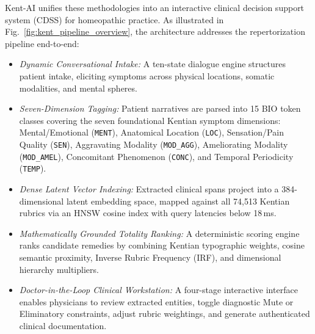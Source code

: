 Kent-AI unifies these methodologies into an interactive clinical decision support system (CDSS) for homeopathic practice. As illustrated in Fig.~\ref{fig:kent_pipeline_overview}, the architecture addresses the repertorization pipeline end-to-end:
\begin{itemize}
    \item \textit{Dynamic Conversational Intake:} A ten-state dialogue engine structures patient intake, eliciting symptoms across physical locations, somatic modalities, and mental spheres.
    \item \textit{Seven-Dimension Tagging:} Patient narratives are parsed into 15 BIO token classes covering the seven foundational Kentian symptom dimensions: Mental/Emotional (\texttt{MENT}), Anatomical Location (\texttt{LOC}), Sensation/Pain Quality (\texttt{SEN}), Aggravating Modality (\texttt{MOD\_AGG}), Ameliorating Modality (\texttt{MOD\_AMEL}), Concomitant Phenomenon (\texttt{CONC}), and Temporal Periodicity (\texttt{TEMP}).
    \item \textit{Dense Latent Vector Indexing:} Extracted clinical spans project into a 384-dimensional latent embedding space, mapped against all 74,513 Kentian rubrics via an HNSW cosine index with query latencies below 18\,ms.
    \item \textit{Mathematically Grounded Totality Ranking:} A deterministic scoring engine ranks candidate remedies by combining Kentian typographic weights, cosine semantic proximity, Inverse Rubric Frequency (IRF), and dimensional hierarchy multipliers.
    \item \textit{Doctor-in-the-Loop Clinical Workstation:} A four-stage interactive interface enables physicians to review extracted entities, toggle diagnostic Mute or Eliminatory constraints, adjust rubric weightings, and generate authenticated clinical documentation.
\end{itemize}

